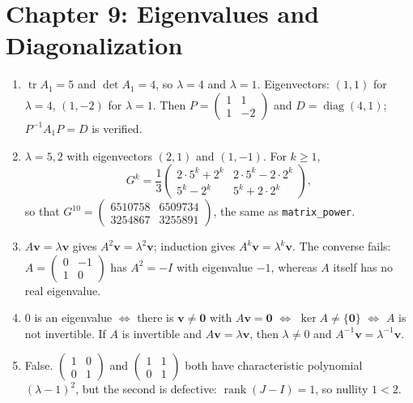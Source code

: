 \section*{Chapter 9: Eigenvalues and Diagonalization}
\begin{enumerate}[label=\textbf{9.\arabic*}]
  \item $\operatorname{tr}A_{1}=5$ and $\det A_{1}=4$, so $\lambda=4$ and
        $\lambda=1$. Eigenvectors: $(1,1)$ for $\lambda=4$, $(1,-2)$ for
        $\lambda=1$. Then $P=\begin{pmatrix}1&1\\1&-2\end{pmatrix}$ and
        $D=\operatorname{diag}(4,1)$; $P^{-1}A_{1}P=D$ is verified.

  \item $\lambda=5,2$ with eigenvectors $(2,1)$ and $(1,-1)$. For
        $k\ge1$,
        \[
          G^{k}=\frac13
          \begin{pmatrix}2\cdot5^{k}+2^{k}&2\cdot5^{k}-2\cdot2^{k}\\
          5^{k}-2^{k}&5^{k}+2\cdot2^{k}\end{pmatrix},
        \]
        so that
        $G^{10}=\begin{pmatrix}6510758&6509734\\3254867&3255891\end{pmatrix}$,
        the same as \texttt{matrix\_power}.

  \item $A\mathbf{v}=\lambda\mathbf{v}$ gives
        $A^{2}\mathbf{v}=\lambda^{2}\mathbf{v}$; induction gives
        $A^{k}\mathbf{v}=\lambda^{k}\mathbf{v}$. The converse fails:
        $A=\begin{pmatrix}0&-1\\1&0\end{pmatrix}$ has $A^{2}=-I$ with eigenvalue
        $-1$, whereas $A$ itself has no real eigenvalue.

  \item $0$ is an eigenvalue $\iff$ there is $\mathbf{v}\ne\mathbf{0}$ with
        $A\mathbf{v}=\mathbf{0}$ $\iff$ $\ker A\ne\{\mathbf{0}\}$ $\iff$ $A$ is not
        invertible. If $A$ is invertible and $A\mathbf{v}=\lambda\mathbf{v}$, then
        $\lambda\ne0$ and $A^{-1}\mathbf{v}=\lambda^{-1}\mathbf{v}$.

  \item False. $\begin{pmatrix}1&0\\0&1\end{pmatrix}$ and
        $\begin{pmatrix}1&1\\0&1\end{pmatrix}$ both have characteristic
        polynomial $(\lambda-1)^{2}$, but the second is defective:
        $\operatorname{rank}(J-I)=1$, so nullity $1<2$.


\end{enumerate}
